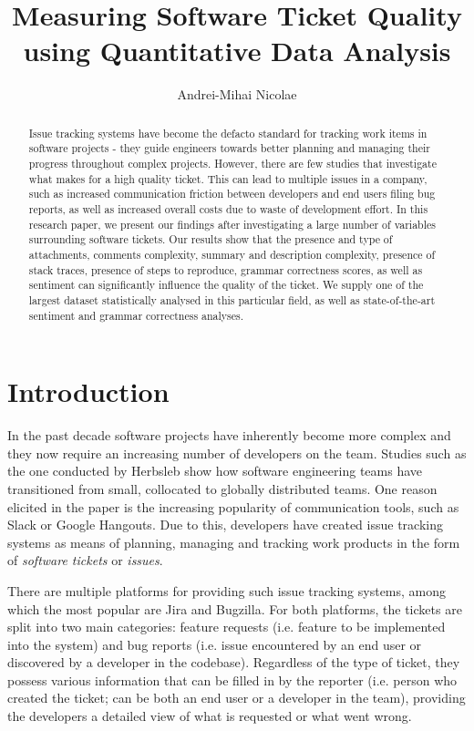 \documentclass{mpaper}
\begin{document}
\title{Measuring Software Ticket Quality using Quantitative Data Analysis}
\author{Andrei-Mihai Nicolae}

\maketitle

\begin{abstract}
Issue tracking systems have become the defacto standard for tracking work items in 
software projects - they guide engineers towards better planning and 
managing their progress throughout complex projects. However, there
are few studies that investigate what makes for a high quality ticket. This can lead to 
multiple issues in a company, such as increased communication friction between developers and end users filing bug
reports, as well as increased overall costs due to waste of development effort. 
In this research paper, we present our findings after 
investigating a large number of variables surrounding software tickets.
Our results show that the presence and type of attachments,
comments complexity, summary and description complexity, presence of stack traces, presence
of steps to reproduce, grammar correctness scores, as well as sentiment can significantly influence 
the quality of the ticket. We supply one of the largest dataset statistically 
analysed in this particular field, as well as state-of-the-art sentiment and grammar correctness analyses.
\end{abstract}

\section{Introduction}\label{intro}

In the past decade software projects have inherently become more complex and they now require an increasing number of developers 
on the team. Studies such as the one conducted by Herbsleb \cite{herbsleb2007global} show how software engineering teams have 
transitioned from small, collocated to globally distributed teams. One reason elicited in the paper is the increasing 
popularity of communication tools, such as Slack or Google Hangouts. Due to this, developers have created issue tracking 
systems as means of planning, managing and tracking work products in the form of \emph{software tickets} or \emph{issues}.

There are multiple platforms for providing such issue tracking systems, among which
the most popular are Jira and Bugzilla. For both platforms,
the tickets are split into two main categories: feature requests (i.e. feature to be 
implemented into the system) and bug reports (i.e. issue encountered by an end user or
discovered by a developer in the codebase). Regardless of the type of ticket, they possess
various information that can be filled in by the reporter (i.e. person who created the ticket; 
can be both an end user or a developer in the team), providing the developers
a detailed view of what is requested or what went wrong.
\end{document}
